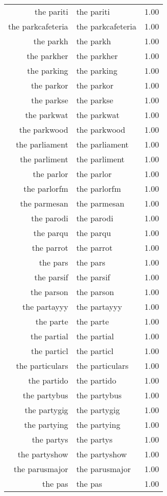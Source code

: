 \begin{table}[ht]
\begin{tabular}{rlr}
  the pariti & the pariti & 1.00 \\ 
  the parkcafeteria & the parkcafeteria & 1.00 \\ 
  the parkh & the parkh & 1.00 \\ 
  the parkher & the parkher & 1.00 \\ 
  the parking & the parking & 1.00 \\ 
  the parkor & the parkor & 1.00 \\ 
  the parkse & the parkse & 1.00 \\ 
  the parkwat & the parkwat & 1.00 \\ 
  the parkwood & the parkwood & 1.00 \\ 
  the parliament & the parliament & 1.00 \\ 
  the parliment & the parliment & 1.00 \\ 
  the parlor & the parlor & 1.00 \\ 
  the parlorfm & the parlorfm & 1.00 \\ 
  the parmesan & the parmesan & 1.00 \\ 
  the parodi & the parodi & 1.00 \\ 
  the parqu & the parqu & 1.00 \\ 
  the parrot & the parrot & 1.00 \\ 
  the pars & the pars & 1.00 \\ 
  the parsif & the parsif & 1.00 \\ 
  the parson & the parson & 1.00 \\ 
  the partayyy & the partayyy & 1.00 \\ 
  the parte & the parte & 1.00 \\ 
  the partial & the partial & 1.00 \\ 
  the particl & the particl & 1.00 \\ 
  the particulars & the particulars & 1.00 \\ 
  the partido & the partido & 1.00 \\ 
  the partybus & the partybus & 1.00 \\ 
  the partygig & the partygig & 1.00 \\ 
  the partying & the partying & 1.00 \\ 
  the partys & the partys & 1.00 \\ 
  the partyshow & the partyshow & 1.00 \\ 
  the parusmajor & the parusmajor & 1.00 \\ 
  the pas & the pas & 1.00 \\ 

\end{tabular}
\end{table}
